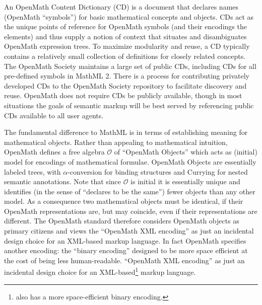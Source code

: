 \documentclass{llncs}
\begin{document}
An OpenMath Content Dictionary (CD) is a document that declares names (OpenMath
``symbols'') for basic mathematical concepts and objects. CDs act as the unique points of
reference for OpenMath symbols (and their encodings the {} elements) and
thus supply a notion of context that situates and disambiguates OpenMath expression
trees. To maximize modularity and reuse, a CD typically contains a relatively small
collection of definitions for closely related concepts. The OpenMath Society maintains a
large set of public CDs, including CDs for all pre-defined symbols in MathML 2. There is a
process for contributing privately developed CDs to the OpenMath Society repository to
facilitate discovery and reuse. OpenMath does not require CDs be publicly available,
though in most situations the goals of semantic markup will be best served by referencing
public CDs available to all user agents.
 
The fundamental difference to MathML is in terms of establishing meaning for mathematical
objects. Rather than appealing to mathematical intuition, OpenMath defines a free algebra
$\mathcal{O}$ of ``OpenMath Objects'' which acts as (initial) model for encodings of
mathematical formulae. OpenMath Objects are essentially labeled trees, with
$\alpha$-conversion for binding structures and Currying for nested semantic
annotations. Note that since $\mathcal{O}$ is initial it is essentially unique and
identifies (in the sense of ``declares to be the same'') fewer objects than any other
model. As a consequence two mathematical objects must be identical, if their OpenMath
representations are, but may coincide, even if their representations are different. The
OpenMath standard therefore considers OpenMath objects as primary citizens and views the
``OpenMath XML encoding'' as just an incidental design choice for an XML-based markup
language. In fact OpenMath specifies another encoding: the ``binary encoding'' designed to
be more space efficient at the cost of being less human-readable.
``OpenMath XML encoding'' as just an incidental design choice for an 
XML-based\footnote{{\openmath} also has a more space-efficient binary encoding.} markup language.
\end{document}
